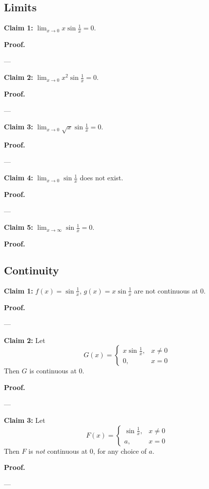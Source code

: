 \clearpage
\subsection{Limits}

\textbf{Claim 1:} $\lim_{x\to0}x\sin \frac{1}{x}=0$.

\textbf{Proof.}

\vs---\vs

\textbf{Claim 2:} $\lim_{x\to0}x^2\sin \frac{1}{x}=0$.

\textbf{Proof.}

\vs---\vs

\textbf{Claim 3:} $\lim_{x\to0}\sqrt{x}\sin \frac{1}{x}=0$.

\textbf{Proof.}

\vs---\vs

\textbf{Claim 4:} $\lim_{x\to0}\sin \frac{1}{x}$ does not exist.

\textbf{Proof.}

\vs---\vs

\textbf{Claim 5:} $\lim_{x\to\infty}\sin \frac{1}{x}=0$.

\textbf{Proof.}

\subsection{Continuity}

\textbf{Claim 1:} $f(x)=\sin \frac{1}{x}$, $g(x)=x\sin \frac{1}{x}$ are not continuous at $0$.

\textbf{Proof.}

\vs---\vs

\textbf{Claim 2:} Let
\[G(x)=\begin{cases}
  x\sin \frac{1}{x},&x\neq0\\
  0,&x=0
\end{cases}\]
Then $G$ is continuous at $0$.

\vs

\textbf{Proof.}

\vs---\vs

\textbf{Claim 3:} Let
\[F(x)=\begin{cases}
  \sin \frac{1}{x},&x\neq0\\
  a,&x=0
\end{cases}\]
Then $F$ is \textit{not} continuous at $0$, for any choice of $a$.

\vs

\textbf{Proof.}

\vs---\vs


